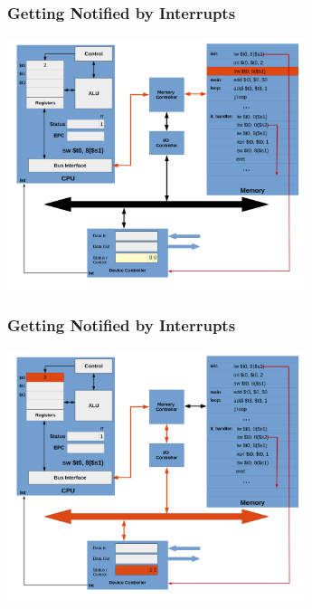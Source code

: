 \documentclass{beamer}
\begin{document}
\begin{frame}[fragile]
\frametitle{Getting Notified by Interrupts}

\begin{center}
\vspace*{-0.23cm}
\hspace*{-1cm}\includegraphics[width=8.7cm]{interrupt_waiting6.pdf}
\end{center}

\end{frame}

\begin{frame}[fragile]
\frametitle{Getting Notified by Interrupts}

\begin{center}
\vspace*{-0.23cm}
\hspace*{-1cm}\includegraphics[width=8.7cm]{interrupt_waiting7.pdf}
\end{center}

\end{frame}
\end{document}
